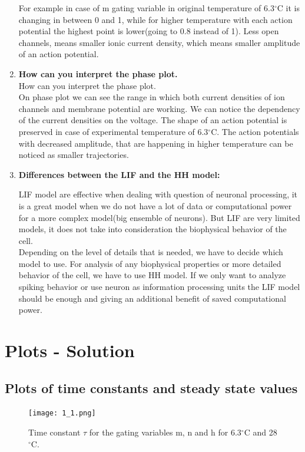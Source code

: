 \documentclass{scrartcl}			%
\begin{document}
\begin{enumerate}
For example in case of m gating variable in original temperature of 6.3$^{\circ}$C it is changing in between 0 and 1, while for higher temperature with each action potential the highest point is lower(going to 0.8 instead of 1). Less open channels, means smaller ionic current density, which means smaller amplitude of an action potential.


\item \textbf{How can you interpret the phase plot.\\}How can you interpret the phase plot.\\

On phase plot we can see the range in which both current densities of ion channels and membrane potential are working. We can notice the dependency of the current densities on the voltage. The shape of an action potential is preserved in case of experimental temperature of 6.3$^{\circ}$C. The action potentials with decreased amplitude, that are happening in higher temperature can be noticed as smaller trajectories.


\item \textbf{Differences between the LIF and the HH model:\\}

LIF model are effective when dealing with question of neuronal processing, it is a great model when we do not have a lot of data or computational power for a more complex model(big ensemble of neurons). But LIF are very 
limited models, it does not take into consideration the biophysical behavior of the cell.\\

Depending on the level of details that is needed, we have to decide which model to use. For analysis of any biophysical properties or more detailed behavior of the cell, we have to use HH model. If we only want to analyze spiking behavior or use neuron as information processing units the LIF model should be enough and giving an additional benefit of saved computational power. 
\end{enumerate}

\newpage
\section{Plots - Solution}
\subsection{Plots of time constants and steady state values}
\begin{figure}[hbpt!]					%
	\begin{flushleft}
		\hspace*{-0.1in}
		\texttt{[image: 1\_1.png]}
		\captionsetup{width=\linewidth}  %
		\caption{Time constant $\tau$ for the gating variables m, n and h for 6.3$^{\circ}$C and 28$^{\circ}$C.}		
		\label{fig1_1} %
	\end{flushleft}
\end{figure}
\end{document}

